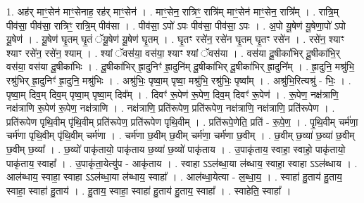 \documentclass[17pt]{extarticle}
\begin{document}
1. अह॑र् माꣳ॒॒सेन॑ माꣳ॒॒सेनाह॒ रह॑र् माꣳ॒॒सेन॑ । . माꣳ॒॒सेन॒ रात्रिꣳ॒॒ रात्रि॑म् माꣳ॒॒सेन॑ माꣳ॒॒सेन॒ रात्रि᳚म् । . रात्रि॒म् पीव॑सा॒ पीव॑सा॒ रात्रिꣳ॒॒ रात्रि॒म् पीव॑सा । . पीव॑सा॒ ऽपो॑ ऽपः पीव॑सा॒ पीव॑सा॒ ऽपः । . अ॒पो यू॒षेण॑ यू॒षेणा॒पो॑ ऽपो यू॒षेण॑ । . यू॒षेण॑ घृ॒तम् घृ॒तं ॅयू॒षेण॑ यू॒षेण॑ घृ॒तम् । . घृ॒तꣳ रसे॑न॒ रसे॑न घृ॒तम् घृ॒तꣳ रसे॑न । . रसे॑न॒ श्याꣳ श्याꣳ रसे॑न॒ रसे॑न॒ श्याम् । . श्यां ॅवस॑या॒ वस॑या॒ श्याꣳ श्यां ॅवस॑या । . वस॑या दू॒षीका॑भिर् दू॒षीका॑भि॒र् वस॑या॒ वस॑या दू॒षीका॑भिः । . दू॒षीका॑भिर् ह्रा॒दुनिꣳ॑ ह्रा॒दुनि॑म् दू॒षीका॑भिर् दू॒षीका॑भिर् ह्रा॒दुनि᳚म् । . ह्रा॒दुनि॒ मश्रु॑भि॒ रश्रु॑भिर् ह्रा॒दुनिꣳ॑ ह्रा॒दुनि॒ मश्रु॑भिः । . अश्रु॑भिः॒ पृष्वा॒म् पृष्वा॒ मश्रु॑भि॒ रश्रु॑भिः॒ पृष्वा᳚म् । . अश्रु॑भि॒रित्यश्रु॑ - भिः॒ । . पृष्वा॒म् दिव॒म् दिव॒म् पृष्वा॒म् पृष्वा॒म् दिव᳚म् । . दिवꣳ॑ रू॒पेण॑ रू॒पेण॒ दिव॒म् दिवꣳ॑ रू॒पेण॑ । . रू॒पेण॒ नक्ष॑त्राणि॒ नक्ष॑त्राणि रू॒पेण॑ रू॒पेण॒ नक्ष॑त्राणि । . नक्ष॑त्राणि॒ प्रति॑रूपेण॒ प्रति॑रूपेण॒ नक्ष॑त्राणि॒ नक्ष॑त्राणि॒ प्रति॑रूपेण । . प्रति॑रूपेण पृथि॒वीम् पृ॑थि॒वीम् प्रति॑रूपेण॒ प्रति॑रूपेण पृथि॒वीम् । . प्रति॑रूपे॒णेति॒ प्रति॑ - रू॒पे॒ण॒ । . पृ॒थि॒वीम् चर्म॑णा॒ चर्म॑णा पृथि॒वीम् पृ॑थि॒वीम् चर्म॑णा । . चर्म॑णा छ॒वीम् छ॒वीम् चर्म॑णा॒ चर्म॑णा छ॒वीम् । . छ॒वीम् छ॒व्या॑ छ॒व्या॑ छ॒वीम् छ॒वीम् छ॒व्या᳚ । . छ॒व्यो॑ पाकृ॑तायो॒ पाकृ॑ताय छ॒व्या॑ छ॒व्यो॑ पाकृ॑ताय । . उ॒पाकृ॑ताय॒ स्वाहा॒ स्वाहो॒ पाकृ॑तायो॒ पाकृ॑ताय॒ स्वाहा᳚ । . उ॒पाकृ॑ता॒येत्यु॑प - आकृ॑ताय । . स्वाहा ऽऽल॑ब्धा॒या ल॑ब्धाय॒ स्वाहा॒ स्वाहा ऽऽल॑ब्धाय । . आल॑ब्धाय॒ स्वाहा॒ स्वाहा ऽऽल॑ब्धा॒या ल॑ब्धाय॒ स्वाहा᳚ । . आल॑ब्धा॒येत्या - ल॒ब्धा॒य॒ । . स्वाहा॑ हु॒ताय॑ हु॒ताय॒ स्वाहा॒ स्वाहा॑ हु॒ताय॑ । . हु॒ताय॒ स्वाहा॒ स्वाहा॑ हु॒ताय॑ हु॒ताय॒ स्वाहा᳚ । . स्वाहेति॒ स्वाहा᳚ । \newline
\end{document}
